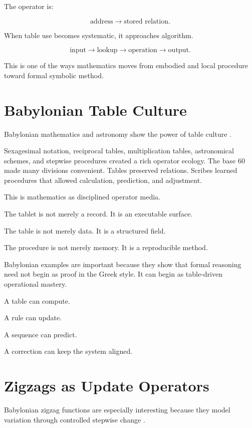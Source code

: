 \documentclass[11pt]{book}
\begin{document}
The operator is:

\[
\text{address} \rightarrow \text{stored relation}.
\]

When table use becomes systematic, it approaches algorithm.

\[
\text{input}
\rightarrow
\text{lookup}
\rightarrow
\text{operation}
\rightarrow
\text{output}.
\]

This is one of the ways mathematics moves from embodied and local procedure toward formal symbolic method.

\section{Babylonian Table Culture}

Babylonian mathematics and astronomy show the power of table culture \cite{Neugebauer1957ExactSciences,Robson2008MathematicsAncientIraq,HungerPingree1999AstralSciences,Ossendrijver2016AncientBabylonianAstronomers}.

Sexagesimal notation, reciprocal tables, multiplication tables, astronomical schemes, and stepwise procedures created a rich operator ecology. The base \(60\) made many divisions convenient. Tables preserved relations. Scribes learned procedures that allowed calculation, prediction, and adjustment.

This is mathematics as disciplined operator media.

The tablet is not merely a record. It is an executable surface.

The table is not merely data. It is a structured field.

The procedure is not merely memory. It is a reproducible method.

Babylonian examples are important because they show that formal reasoning need not begin as proof in the Greek style. It can begin as table-driven operational mastery.

A table can compute.

A rule can update.

A sequence can predict.

A correction can keep the system aligned.

\section{Zigzags as Update Operators}

Babylonian zigzag functions are especially interesting because they model variation through controlled stepwise change \cite{Neugebauer1957ExactSciences,HungerPingree1999AstralSciences,Ossendrijver2016AncientBabylonianAstronomers}.
\end{document}
